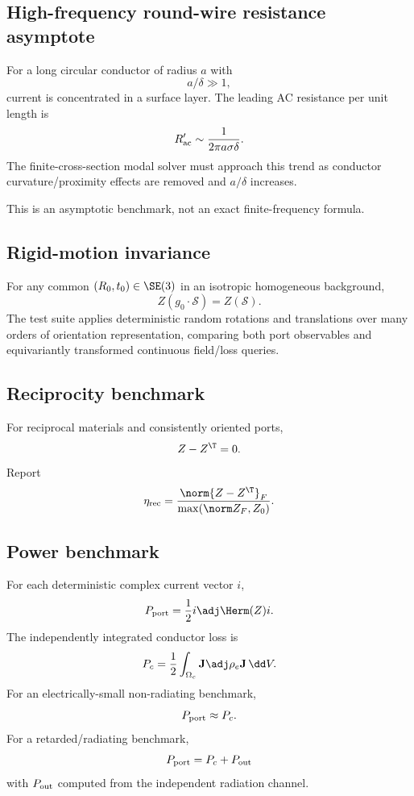 \subsection{High-frequency round-wire resistance asymptote}

For a long circular conductor of radius $a$ with
\[
  a/\delta\gg1,
\]
current is concentrated in a surface layer. The leading AC resistance per unit
length is
\[
  R'_{\rm ac}
  \sim
  \frac{1}{2\pi a\sigma\delta}.
  \label{eq:skin-asymptote}
\]
The finite-cross-section modal solver must approach this trend as conductor
curvature/proximity effects are removed and $a/\delta$ increases.

This is an asymptotic benchmark, not an exact finite-frequency formula.

\subsection{Rigid-motion invariance}

For any common $(R_0,t_0)\in\SE(3)$ in an isotropic homogeneous background,
\[
  Z(g_0\cdot\mathcal S)
  =
  Z(\mathcal S).
  \label{eq:rigid-benchmark}
\]
The test suite applies deterministic random rotations and translations over
many orders of orientation representation, comparing both port observables and
equivariantly transformed continuous field/loss queries.

\subsection{Reciprocity benchmark}

For reciprocal materials and consistently oriented ports,
\[
  Z-Z^\T=0.
\]
Report
\[
  \eta_{\rm rec}
  =
  \frac{\norm{Z-Z^\T}_F}
       {\max(\norm Z_F,Z_0)}.
\]

\subsection{Power benchmark}

For each deterministic complex current vector $i$,
\[
 P_{\rm port}
 =
 \frac12 i\adj\Herm(Z)i.
\]
The independently integrated conductor loss is
\[
 P_c
 =
 \frac12
 \int_{\Omega_c}
 \mathbf J\adj\rho_e\mathbf J\,\dd V.
\]
For an electrically-small non-radiating benchmark,
\[
  P_{\rm port}\approx P_c.
\]
For a retarded/radiating benchmark,
\[
  P_{\rm port}=P_c+P_{\rm out}
\]
with $P_{\rm out}$ computed from the independent radiation channel.

